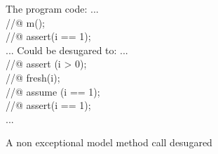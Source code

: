 \begin{figure}
\begin{center}\begin{minipage}{4cm}
The program code:
\bcode
...\\
//@ m();\\
//@ assert(i == 1);\\
...
\ecode
Could be desugared to:
\bcode
...\\
//@ assert (i > 0);\\
//@ fresh(i);\\
//@ assume (i == 1);\\
//@ assert(i == 1);\\
...
\ecode
\end{minipage}\end{center}
\caption{A non exceptional model method call desugared}
\label{model_meth}
\end{figure}